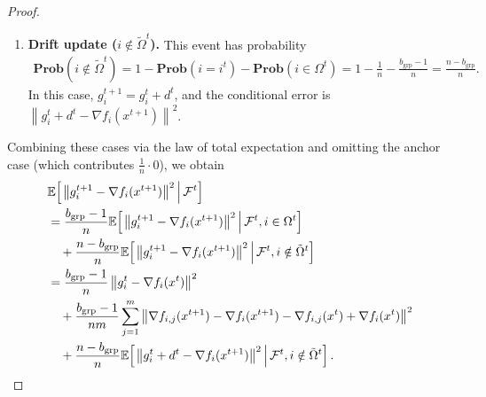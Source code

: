 \documentclass{article}
\newcommand{\sqn}[1]{\left\| #1 \right\|^2}
\newcommand{\Prob}{\mathbf{Prob}}
\newcommand{\Expb}[2]{\mathbb{E}\!\left[\left. #1\,\right|#2 \right]}
\newcommand{\Expc}[1]{\Expb{#1}{\mathcal{F}^t}}
\theoremstyle{plain}
\begin{document}
\begin{proof}
\begin{enumerate}
\item \textbf{Drift update ($i\notin\tilde{\Omega}^t$).} This event has probability
\begin{align*}
\Prob(i\notin\tilde{\Omega}^t)=1-\Prob(i=i^t)-\Prob(i\in\Omega^t)=1-\frac{1}{n}-\frac{b_{\mathrm{grp}}-1}{n}=\frac{n-b_{\mathrm{grp}}}{n}.
\end{align*}
In this case, $g_i^{t+1}=g_i^t+d^t$, and the conditional error is $\sqn{g_i^{t}+d^t-\nabla f_i(x^{t+1})}$.
\end{enumerate}

Combining these cases via the law of total expectation and omitting the anchor case (which contributes $\frac{1}{n}\cdot 0$), we obtain
\begin{align}
&\Expc{\sqn{g_i^{t+1}-\nabla f_i(x^{t+1})}} \notag\\
&=\frac{b_{\mathrm{grp}}-1}{n} \Expb{\sqn{g_i^{t+1}-\nabla f_i(x^{t+1})}}{\mathcal{F}^t, i\in\Omega^t}\notag\\
&\quad +\frac{n-b_{\mathrm{grp}}}{n} \Expb{\sqn{g_i^{t+1}-\nabla f_i(x^{t+1})}}{\mathcal{F}^t, i\notin\tilde{\Omega}^t}\notag\\
&=\frac{b_{\mathrm{grp}}-1}{n} \sqn{g_i^t - \nabla f_i(x^{t})}\notag\\
&\quad+\frac{b_{\mathrm{grp}}-1}{nm}\sum_{j=1}^m \sqn{\nabla f_{i,j}(x^{t+1})-\nabla f_i(x^{t+1})-\nabla f_{i,j}(x^{t})+\nabla f_i(x^{t})}\notag\\
&\quad+\frac{n-b_{\mathrm{grp}}}{n} \Expb{\sqn{g_i^{t}+d^t-\nabla f_i(x^{t+1})}}{\mathcal{F}^t, i\notin\tilde{\Omega}^t}.
\label{eqpp1}
\end{align}


\end{proof}
\end{document}
